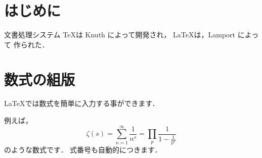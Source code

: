 \documentclass{jarticle}  %
\begin{document}
\section{はじめに}
文書処理システム \TeX は Knuth によって開発され，
\LaTeX は，Lamport によって 作られた．

\section{数式の組版}

\LaTeX では数式を簡単に入力する事ができます．

例えば，
\begin{equation}
	\zeta(s) = \sum_{n=1}^\infty \frac{1}{n^s}
                 = \prod_{p} \frac{1}{1-\frac{1}{p^s}}
\end{equation}
のような数式です．
式番号も自動的につきます．
\end{document}
